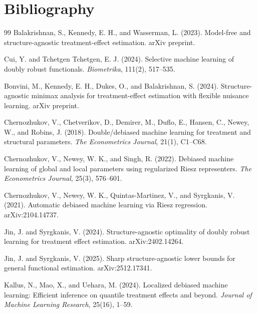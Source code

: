 \documentclass[11pt]{article}
\theoremstyle{definition}
\theoremstyle{plain}
\theoremstyle{remark}
\begin{document}
\section*{Bibliography}
\begin{thebibliography}{99}
Balakrishnan, S., Kennedy, E. H., and Wasserman, L. (2023).
Model-free and structure-agnostic treatment-effect estimation.
arXiv preprint.

Cui, Y. and Tchetgen Tchetgen, E. J. (2024).
Selective machine learning of doubly robust functionals.
\emph{Biometrika}, 111(2), 517--535.

Bonvini, M., Kennedy, E. H., Dukes, O., and Balakrishnan, S. (2024).
Structure-agnostic minimax analysis for treatment-effect estimation with flexible nuisance learning.
arXiv preprint.

Chernozhukov, V., Chetverikov, D., Demirer, M., Duflo, E., Hansen, C., Newey, W., and Robins, J. (2018).
Double/debiased machine learning for treatment and structural parameters.
\emph{The Econometrics Journal}, 21(1), C1--C68.

Chernozhukov, V., Newey, W. K., and Singh, R. (2022).
Debiased machine learning of global and local parameters using regularized Riesz representers.
\emph{The Econometrics Journal}, 25(3), 576--601.

Chernozhukov, V., Newey, W. K., Quintas-Martinez, V., and Syrgkanis, V. (2021).
Automatic debiased machine learning via Riesz regression.
arXiv:2104.14737.

Jin, J. and Syrgkanis, V. (2024).
Structure-agnostic optimality of doubly robust learning for treatment effect estimation.
arXiv:2402.14264.

Jin, J. and Syrgkanis, V. (2025).
Sharp structure-agnostic lower bounds for general functional estimation.
arXiv:2512.17341.

Kallus, N., Mao, X., and Uehara, M. (2024).
Localized debiased machine learning: Efficient inference on quantile treatment effects and beyond.
\emph{Journal of Machine Learning Research}, 25(16), 1--59.


\end{thebibliography}
\end{document}
